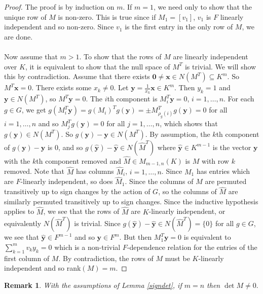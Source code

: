 \documentclass[12pt]{article}
\theoremstyle{plain}
\newtheorem*{remark}{Remark}
\begin{document}
\begin{proof}
The proof is by induction on $m$. If $m = 1$, we need only to show that the unique row of $M$ is non-zero. This is true since if $M_1 = [v_1]$, $v_1$ is $F$ linearly independent and so non-zero. Since $v_1$ is the first entry in the only row of $M$, we are done.\\
\\
Now assume that $m >1$. To show that the rows of $M$ are linearly independent over $K$, it is equivalent to show that the null space of $M^T$ is trivial. We will show this by contradiction. Assume that there exists $\textbf{0} \neq \textbf{x} \in N(M^T) \subseteq K^m$. So $M^T\textbf{x} = 0$. There exists some $x_k \neq 0$. Let $\textbf{y}= \frac{1}{x_k}\textbf{x} \in K^m$. Then $y_k = 1$ and $\textbf{y}\in N(M^T)$, so $M^T \textbf{y}=0$. The $i$th component is $M^T_i \textbf{y}= 0 $, $i = 1, \ldots, n$. For each $g \in G$, we get $g(M^T_i \textbf{y}) = g(M_i)^Tg(\textbf{y}) = \pm M^T_{\rho_g(i)}g(\textbf{y}) = 0$ for all $i = 1, \ldots , n$ and so $M^T_jg(\textbf{y}) = 0$ for all $j = 1, \ldots , n$, which shows that $g(\textbf{y}) \in N(M^T)$. So $g(\textbf{y}) -\textbf{y} \in N(M^T)$. By assumption, the $k$th component of $g(\textbf{y}) - \textbf{y} $ is $0$, and so $g(\hat{\textbf{y}}) - \hat{\textbf{y}}\in N(\hat{M}^T)$ where $\hat{\textbf{y}} \in K^{m-1}$ is the vector $\textbf{y}$ with the $k$th component removed and $\hat{M} \in M_{m-1,n}(K)$ is $M$ with row $k$ removed. Note that $\hat{M}$ has columns $\hat{M}_i$, $i = 1, \ldots, n$. Since $M_1$ has entries which are $F$-linearly independent, so does $\hat{M}_1$. Since the columns of $M$ are permuted transitively up to sign changes by the action of $G$, so the columns of $\hat{M}$ are similarly permuted transitively up to sign changes. Since the inductive hypothesis applies to $\hat{M}$, we see that the rows of $\hat{M}$ are $K$-linearly independent, or equivalently $N(\hat{M}^T)$ is trivial. Since $g(\hat{\textbf{y}}) -\hat{\textbf{y}} \in N(\hat{M}^T) = \lbrace 0 \rbrace$ for all $ g \in G$, we see that $\hat{\textbf{y}}\in F^{m-1}$ and so $\textbf{y} \in F^m$. But then $M^T_1 \textbf{y} = 0 $ is equivalent to $\sum^m_{k = 1}v_ky_k = 0$ which is a non-trivial $F$-dependence relation for the entries of the first column of $M$. By contradiction, the rows of $M$ must be $K$-linearly independent and so rank$(M) = m$. 
 \end{proof} 
\begin{remark}
With the assumptions of Lemma \ref{signdet}, if $m= n$ then $\det{M}\neq 0.$
\end{remark}
\end{document}
